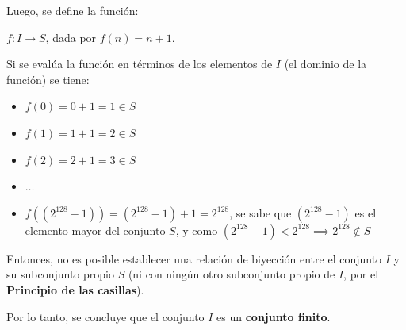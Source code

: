 \documentclass{article}
\begin{document}
Luego, se define la función:

$f: I \to S$, dada por $f(n) = n + 1$.

Si se evalúa la función en términos de los elementos de $I$ (el dominio de la función) se tiene:

\begin{itemize}
    \item $f(0) = 0 + 1 = 1 \in S$
    \item $f(1) = 1 + 1 = 2 \in S$
    \item $f(2) = 2 + 1 = 3 \in S$
    \item $\dots$
    \item $f((2^{128} - 1)) =  (2^{128} - 1) + 1 = 2^{128}$, se sabe que $(2^{128} - 1)$ es el elemento mayor del conjunto $S$, y como $(2^{128} - 1) < 2^{128} \implies 2^{128} \not \in S$
\end{itemize}

Entonces, no es posible establecer una relación de biyección entre el conjunto $I$ y su subconjunto propio $S$ (ni con ningún otro subconjunto propio de $I$, por el \textbf{Principio de las casillas}).

Por lo tanto, se concluye que el conjunto $I$ es un \textbf{conjunto finito}.
\end{document}
